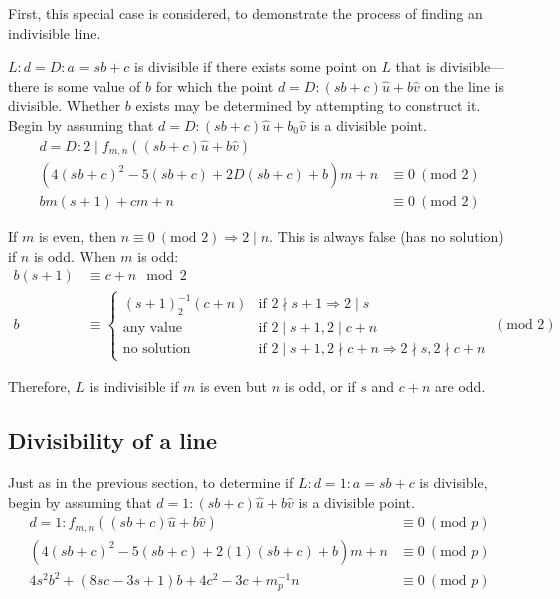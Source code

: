 \documentclass{article}
\begin{document}
First, this special case is considered, to demonstrate the process of finding an indivisible line.

\(L:d=D:a=sb+c\) is divisible if there exists some point on \(L\) that is divisible---there is some value of \(b\) for which the point \(d=D:(sb+c)\hat{u}+b\hat{v}\) on the line is divisible. Whether \(b\) exists may be determined by attempting to construct it. Begin by assuming that \(d=D:(sb+c)\hat{u}+b_0\hat{v}\) is a divisible point.
\begin{align}
	\nonumber d=D:2 \mid f_{m,n}((sb+c)\hat{u}+b\hat{v}) \\
	\nonumber (4(sb+c)^2 - 5(sb+c) + 2D(sb+c) + b)m + n &\equiv 0\ (\text{mod }2) \\
	\nonumber bm(s + 1) + cm + n &\equiv 0\ (\text{mod }2)
\end{align}

If \(m\) is even, then \(n \equiv 0\ (\text{mod }2) \Rightarrow 2 \mid n\). This is always false (has no solution) if \(n\) is odd. When \(m\) is odd:
\begin{align}
	\nonumber b(s + 1) &\equiv c + n \mod 2 \\
	\nonumber b &\equiv \begin{cases}
			   (s + 1)^{-1}_2(c + n)	& \text{if } 2 \nmid s + 1 \Rightarrow 2 \mid s \\
			   \text{any value}			& \text{if } 2 \mid s + 1,2 \mid c + n \\
			   \text{no solution}		& \text{if } 2 \mid s + 1,2 \nmid c + n \Rightarrow 2 \nmid s, 2 \nmid c + n
	\end{cases}\ (\text{mod }2)
\end{align}

Therefore, \(L\) is indivisible if \(m\) is even but \(n\) is odd, or if \(s\) and \(c + n\) are odd.


\subsection{Divisibility of a line}

Just as in the previous section, to determine if \(L:d=1:a=sb+c\) is divisible, begin by assuming that \(d=1:(sb+c)\hat{u}+b\hat{v}\) is a divisible point.
\begin{align}
	d=1:f_{m,n}((sb+c)\hat{u}+b\hat{v}) &\equiv 0\ (\text{mod }p) \\
	(4(sb+c)^2 - 5(sb+c) + 2(1)(sb+c) + b)m + n &\equiv 0\ (\text{mod }p) \\
	4s^2b^2 + (8sc - 3s + 1)b + 4c^2 - 3c + m^{-1}_pn &\equiv 0\ (\text{mod }p)
\end{align}
	
\end{document}
